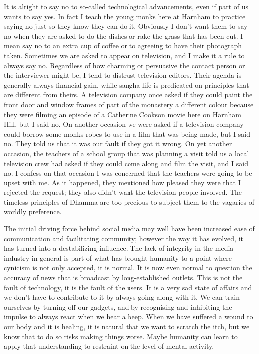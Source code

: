 It is alright to say no to so-called technological advancements, even if
part of us wants to say yes. In fact I teach the young monks here at
Harnham to practice saying no just so they know they can do it.
Obviously I don't want them to say no when they are asked to do the
dishes or rake the grass that has been cut. I mean say no to an extra
cup of coffee or to agreeing to have their photograph taken. Sometimes
we are asked to appear on television, and I make it a rule to always say
no. Regardless of how charming or persuasive the contact person or the
interviewer might be, I tend to distrust television editors. Their
agenda is generally always financial gain, while sangha life is
predicated on principles that are different from theirs. A television
company once asked if they could paint the front door and window frames
of part of the monastery a different colour because they were filming an
episode of a Catherine Cookson movie here on Harnham Hill, but I said
no. On another occasion we were asked if a television company could
borrow some monks robes to use in a film that was being made, but I said
no. They told us that it was our fault if they got it wrong. On yet
another occasion, the teachers of a school group that was planning a
visit told us a local television crew had asked if they could come along
and film the visit, and I said no. I confess on that occasion I was
concerned that the teachers were going to be upset with me. As it
happened, they mentioned how pleased they were that I rejected the
request; they also didn't want the television people involved. The
timeless principles of Dhamma are too precious to subject them to the
vagaries of worldly preference.

The initial driving force behind social media may well have been
increased ease of communication and facilitating community; however the
way it has evolved, it has turned into a destabilizing influence. The
lack of integrity in the media industry in general is part of what has
brought humanity to a point where cynicism is not only accepted, it is
normal. It is now even normal to question the accuracy of news that is
broadcast by long-established outlets. This is not the fault of
technology, it is the fault of the users. It is a very sad state of
affairs and we don't have to contribute to it by always going along with
it. We can train ourselves by turning off our gadgets, and by
recognising and inhibiting the impulse to always react when we hear a
beep. When we have suffered a wound to our body and it is healing, it is
natural that we want to scratch the itch, but we know that to do so
risks making things worse. Maybe humanity can learn to apply that
understanding to restraint on the level of mental activity.

